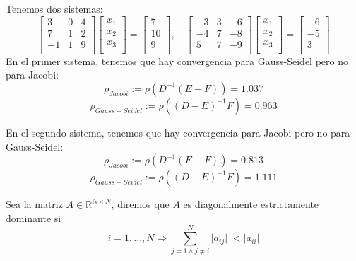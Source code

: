 \begin{ejemplo}
Tenemos dos sistemas:
\[ \begin{bmatrix}
3 & 0 & 4 \\
7 & 1 & 2 \\
-1 & 1 & 9 \\
\end{bmatrix}
\begin{bmatrix}
x_1 \\
x_2 \\
x_3 \\
\end{bmatrix}
=
\begin{bmatrix}
7 \\
10 \\
9 \\
\end{bmatrix}
, \quad
\begin{bmatrix}
-3 & 3 & -6 \\
-4 & 7 & -8 \\
5 & 7 & -9 \\
\end{bmatrix}
\begin{bmatrix}
x_1 \\
x_2 \\
x_3 \\
\end{bmatrix}
=
\begin{bmatrix}
-6 \\
-5 \\
3 \\
\end{bmatrix}
\]
En el primer sistema, tenemos que hay convergencia para Gauss-Seidel pero no para Jacobi:
\[ \rho _{Jacobi} := \rho (D^{-1}(E+F)) = 1.037 \]
\[ \rho _{Gauss-Seidel} := \rho ((D-E)^{-1}F) = 0.963 \]

En el segundo sistema, tenemos que hay convergencia para Jacobi pero no para Gauss-Seidel:
\[ \rho _{Jacobi} := \rho (D^{-1}(E+F)) = 0.813 \]
\[ \rho _{Gauss-Seidel} := \rho ((D-E)^{-1}F) = 1.111 \]
\end{ejemplo}

\newpage

\begin{ndef}
Sea la matriz $A \in \mathbb{R}^{N \times N}$, diremos que $A$ es diagonalmente estrictamente dominante si
\[ i = 1,...,N \Rightarrow \sum_{j=1 \wedge j \neq i}^N \vert a_{ij} \vert \; < \vert a_{ii} \vert \]
\end{ndef}

